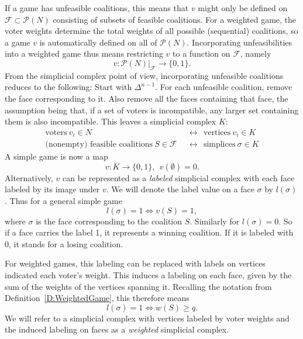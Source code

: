 \documentclass[11pt]{amsart}
\theoremstyle{plain}
\theoremstyle{definition}
\theoremstyle{remark}
\newcommand{\refD}[1]{Definition~\ref{D:#1}}
\begin{document}
If a game has unfeasible coalitions, this means that $v$ might only be defined on $\mathcal F\subset \mathcal P(N)$ consisting of subsets of feasible coalitions. For a weighted game, the voter weights determine the total weights of all possible (sequential) coalitions, so a game $v$ is automatically defined on all of $\mathcal P(N)$. Incorporating unfeasibilities into a weighted game thus means restricting $v$ to a function on $\mathcal F$, namely 
$$
v\colon \mathcal P(N)\vert_{\mathcal F} \longrightarrow \{0,1\}.
$$
From the simplicial complex point of view, incorporating unfeasible coalitions reduces to the following: Start with $\Delta^{n-1}$. For each unfeasible coalition, remove the face corresponding to it. Also remove all the faces containing that face, the assumption being that, if a set of voters is incompatible, any larger set containing them is also incompatible. This leaves a simplicial complex $K$:
\begin{align*}
\text{voters}\  v_i\in N\ \ & \longleftrightarrow\ \    \text{vertices}\  v_i\in K\\
\text{(nonempty) feasible coalitions}\  S\in \mathcal F \ \ & \longleftrightarrow\ \  \text{simplices}\  \sigma\in K
\end{align*}
A simple game is now a map
$$
v\colon K\longrightarrow \{0,1\}, \ \ v(\emptyset)=0.
$$
Alternatively, $v$ can be represented as a \emph{labeled} simplicial complex with each face labeled by its image under $v$. We will denote the label value on a face $\sigma$ by $l(\sigma)$. Thus for a general simple game
$$
l(\sigma) =1 \Longleftrightarrow v(S)=1,
$$
where $\sigma$ is the face corresponding to the coalition $S$. Similarly for $l(\sigma)=0$. So if a face carries the label 1, it represents a winning coalition. If it is labeled with 0, it stands for a losing coalition. 

For weighted games, this labeling can be replaced with labels on vertices indicated each voter's weight. This induces a labeling on each face, given by the sum of the weights of the vertices spanning it. Recalling the notation from \refD{WeightedGame}, this therefore means
$$
l(\sigma) =1 \Longleftrightarrow w(S)\geq q.
$$
 We will refer to a simplicial complex with vertices labeled by voter weights and the induced labeling on faces as a \emph{weighted} simplicial complex.
\end{document}
